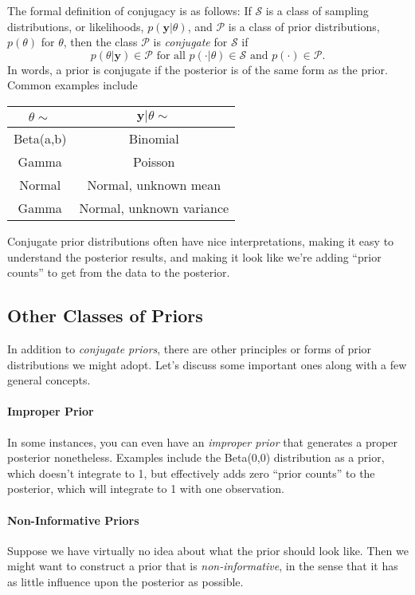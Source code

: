\documentclass[a4paper,12pt]{scrartcl}
\begin{document}
The formal definition of conjugacy is as follows: If $\mathcal{S}$ is
a class of sampling distributions, or likelihoods, 
$p(\mathbf{y} | \theta)$, and $\mathcal{P}$ is a class of prior 
distributions, $p(\theta)$ for $\theta$, then the class
$\mathcal{P}$ is \emph{conjugate} for $\mathcal{S}$ if 
   \[ p(\theta | \mathbf{y}) \in \mathcal{P} 
      \text{ for all } p(\cdot | \theta) \in 
      \mathcal{S} \text{ and } p(\cdot) \in \mathcal{P}.\]
In words, a prior is conjugate if the posterior is of the same form
as the prior. Common examples include
\begin{center}
   \begin{tabular}{ | c | c |}
      \hline
      $\theta \sim$ & $\mathbf{y}|\theta \sim$ \\
      \hline
      Beta(a,b) & Binomial \\ \hline
      Gamma & Poisson \\ \hline
      Normal & Normal, unknown mean  \\\hline
      Gamma & Normal, unknown variance \\\hline
   \end{tabular}
\end{center}
Conjugate prior distributions often have nice interpretations, making
it easy to understand the posterior results, and making it look like
we're adding ``prior counts'' to get from the data to the posterior.

\subsection{Other Classes of Priors}

In addition to \emph{conjugate priors}, there are other principles or
forms of prior distributions we might adopt. Let's discuss some 
important ones along with a few general concepts.

\paragraph{Improper Prior}
In some instances, you can even have an \emph{improper prior} that 
generates a proper posterior nonetheless. Examples include the
Beta(0,0) distribution as a prior, which doesn't integrate to 1, but
effectively adds zero ``prior counts'' to the posterior, which will
integrate to 1 with one observation.

\paragraph{Non-Informative Priors}
Suppose we have virtually no idea about what the prior should look
like. Then we might want to construct a prior that is 
\emph{non-informative}, in the sense that it has as little influence
upon the posterior as possible.
\end{document}

